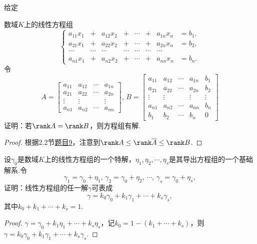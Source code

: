 \begin{prob}[11]
	\hypertarget{SolveEquation}{给定}数域$K$上的线性方程组
	\[\left\{
		\begin{array}{cccccccc}
			a_{11}x_1 & +      & a_{12}x_2 & +      & \cdots & +      & a_{1n}x_n & =b_1, \\
			a_{21}x_1 & +      & a_{22}x_2 & +      & \cdots & +      & a_{2n}x_n & =b_2, \\
			\cdots    & \cdots & \cdots    & \cdots & \cdots & \cdots & \cdots            \\
			a_{n1}x_1 & +      & a_{n2}x_2 & +      & \cdots & +      & a_{nn}x_n & =b_n.
		\end{array}
		\right.\]
	令
	\[
		A=\begin{bmatrix}
			a_{11} & a_{12} & \cdots & a_{1n} \\
			a_{21} & a_{22} & \cdots & a_{2n} \\
			\vdots & \vdots &        & \vdots \\
			a_{n1} & a_{n2} & \cdots & a_{nn}
		\end{bmatrix},\,B=
		\begin{bmatrix}
			a_{11} & a_{12} & \cdots & a_{1n} & b_1    \\
			a_{21} & a_{22} & \cdots & a_{2n} & b_2    \\
			\vdots & \vdots &        & \vdots & \vdots \\
			a_{n1} & a_{n2} & \cdots & a_{nn} & b_n    \\
			b_1    & b_2    & \cdots & b_n    & 0
		\end{bmatrix}
	\]
	证明：若$\rank A=\rank B$，则方程组有解.
\end{prob}
\begin{proof}
	根据2.2节\hyperlink{MatrixRankPartition}{题目9}，注意到$\rank A\le\rank\overline{A}\le\rank B$.
\end{proof}
\begin{prob}[13]
	设$\gamma_0$是数域$K$上的线性方程组的一个特解，$\eta_1,\eta_2,\cdots,\eta_s$是其导出方程组的一个基础解系.令
	\[
		\gamma_1=\gamma_0+\eta_1,\,\gamma_2=\gamma_0+\eta_2,\,\cdots,\,\gamma_s=\gamma_0+\eta_s,
	\]
	\hypertarget{NormalSolutionNorm}{证明}：线性方程组的任一解$\gamma$可表成
	\[
		\gamma=k_0\gamma_0+k_1\gamma_1+\cdots+k_s\gamma_s,
	\]
	其中$k_0+k_1+\cdots+k_s=1$.
\end{prob}
\begin{proof}
	$\gamma=\gamma_0+k_1\eta_1+\cdots+k_s\eta_s$，记$k_0=1-(k_1+\cdots+k_s)$，则$\gamma=k_0\gamma_0+k_1\gamma_1+\cdots+k_s\gamma_s$.
\end{proof}

